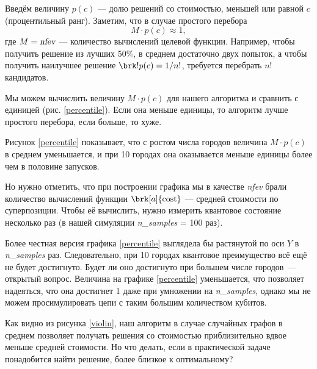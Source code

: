 Введём величину $p(c)$ --- долю решений со стоимостью, меньшей или равной $c$ (процентильный ранг). Заметим, что в случае простого перебора
$$
M \cdot p(c) \approx 1,
$$
где $M = \textsl{nfev}$ --- количество вычислений целевой функции. Например, чтобы получить решение из лучших 50\%, в среднем достаточно двух попыток, а чтобы получить наилучшее решение $\brk!{p(c) = 1/n!}$, требуется перебрать $n!$ кандидатов.

Мы можем вычислить величину $M \cdot p(c)$ для нашего алгоритма и сравнить с единицей (рис. \ref{percentile}). Если она меньше единицы, то алгоритм лучше простого перебора, если больше, то хуже.


Рисунок \ref{percentile} показывает, что с ростом числа городов величина $M \cdot p(c)$ в среднем уменьшается, и при 10 городах она оказывается меньше единицы более чем в половине запусков. 

Но нужно отметить, что при построении графика мы в качестве \textsl{nfev} брали количество вычислений функции $\brk[a]{\text{cost}}$ --- средней стоимости по суперпозиции. Чтобы её вычислить, нужно измерить квантовое состояние несколько раз (в нашей симуляции \textsl{n\_samples} = 100 раз). 

Более честная версия графика \ref{percentile} выглядела бы растянутой по оси $Y$ в \textsl{n\_samples} раз. Следовательно, при 10 городах квантовое преимущество всё ещё не будет достигнуто. Будет ли оно достигнуто при большем числе городов~--- открытый вопрос. Величина на графике \ref{percentile} уменьшается, что позволяет надеяться, что она достигнет 1 даже при умножении на \textsl{n\_samples}, однако мы не можем просимулировать цепи с таким большим количеством кубитов.





Как видно из рисунка \ref{violin}, наш алгоритм в случае случайных графов в среднем позволяет получать решения со стоимостью приблизительно вдвое меньше средней стоимости. 
Но что делать, если в практической задаче понадобится найти решение, более близкое к оптимальному?

